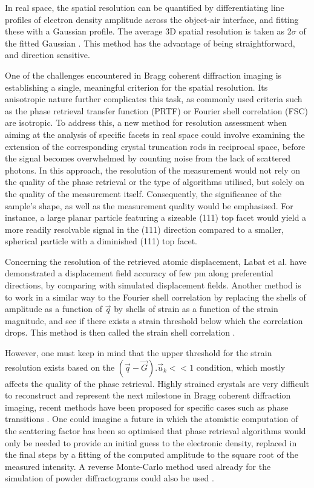 In real space, the spatial resolution can be quantified by differentiating line profiles of electron density amplitude across the object-air interface, and fitting these with a Gaussian profile.
The average 3D spatial resolution is taken as 2$\sigma$ of the fitted Gaussian \parencite{Hofmann2020}.
This method has the advantage of being straightforward, and direction sensitive.

One of the challenges encountered in Bragg coherent diffraction imaging is establishing a single, meaningful criterion for the spatial resolution.
Its anisotropic nature further complicates this task, as commonly used criteria such as the phase retrieval transfer function (PRTF) or Fourier shell correlation (FSC) are isotropic.
To address this, a new method for resolution assessment when aiming at the analysis of specific facets in real space could involve examining the extension of the corresponding crystal truncation rods in reciprocal space, before the signal becomes overwhelmed by counting noise from the lack of scattered photons.
In this approach, the resolution of the measurement would not rely on the quality of the phase retrieval or the type of algorithms utilised, but solely on the quality of the measurement itself.
Consequently, the significance of the sample's shape, as well as the measurement quality would be emphasised.
For instance, a large planar particle featuring a sizeable (111) top facet would yield a more readily resolvable signal in the (111) direction compared to a smaller, spherical particle with a diminished (111) top facet.

Concerning the resolution of the retrieved atomic displacement, Labat et al. \parencite*{Labat2015} have demonstrated a displacement field accuracy of few \unit{pm} along preferential directions, by comparing with simulated displacement fields.
Another method is to work in a similar way to the Fourier shell correlation by replacing the shells of amplitude as a function of $\vec{q}$ by shells of strain as a function of the strain magnitude, and see if there exists a strain threshold below which the correlation drops.
This method is then called the strain shell correlation \parencite{Girard2020}.

However, one must keep in mind that the upper threshold for the strain resolution exists based on the $(\vec{q}-\vec{G}).\vec{u}_k<<1$ condition, which mostly affects the quality of the phase retrieval.
Highly strained crystals are very difficult to reconstruct and represent the next milestone in Bragg coherent diffraction imaging, recent methods have been proposed for specific cases such as phase transitions \parencite{Wang2020}.
One could imagine a future in which the atomistic computation of the scattering factor has been so optimised that phase retrieval algorithms would only be needed to provide an initial guess to the electronic density, replaced in the final steps by a fitting of the computed amplitude to the square root of the measured intensity.
A reverse Monte-Carlo method used already for the simulation of powder diffractograms could also be used \parencite{RLMcGreevy2001}.

